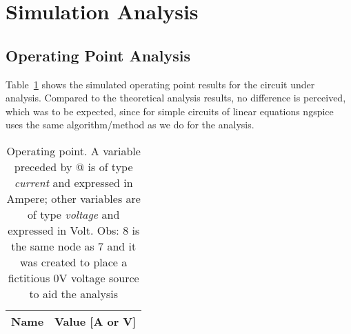 \section{Simulation Analysis}
\label{sec:simulation}

\subsection{Operating Point Analysis}

Table~\ref{tab:op} shows the simulated operating point results for the circuit
under analysis. Compared to the theoretical analysis results, no difference is perceived, which was to be expected, since for simple circuits of linear equations ngspice uses the same algorithm/method as we do for the analysis.

\clearpage

\begin{table}[h]
  \centering
  \begin{tabular}{|l|r|}
    \hline    
    {\bf Name} & {\bf Value [A or V]} \\ \hline
    
  \end{tabular}
  \caption{Operating point. A variable preceded by @ is of type {\em current}
    and expressed in Ampere; other variables are of type {\it voltage} and expressed in Volt. Obs: 8 is the same node as 7 and it was created to place a fictitious 0V voltage source to aid the analysis}
  \label{tab:op}
\end{table}
